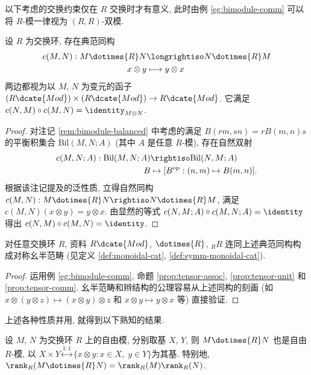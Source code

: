 以下考虑的交换约束仅在 $R$ 交换时才有意义, 此时由例 \ref{eg:bimodule-comm} 可以将 $R$-模一律视为 $(R,R)$-双模.
\begin{proposition}[张量积的交换约束]\label{prop:tensor-comm}
	设 $R$ 为交换环, 存在典范同构
	\begin{align*}
		c(M, N): M \dotimes{R} N & \longrightiso N \dotimes{R} M \\
		x \otimes y & \longmapsto y \otimes x
	\end{align*}
	两边都视为以 $M$, $N$ 为变元的函子 $(R\dcate{Mod}) \times (R\dcate{Mod}) \to R\dcate{Mod}$. 它满足 $c(N, M) \circ c(M, N) = \identity_{M \otimes N}$.
\end{proposition}
\begin{proof}
	对注记 \ref{rem:bimodule-balanced} 中考虑的满足 $B(rm, sn) = r B(m,n) s$ 的平衡积集合 $\text{Bil}(M,N;A)$ (其中 $A$ 是任意 $R$-模), 存在自然双射
	\begin{align*}
		c(M,N;A): \text{Bil}(M, N; A) & \rightiso \text{Bil}(N,M; A) \\
		B & \mapsto [B^\text{op}: (n,m) \mapsto B(m,n)].
	\end{align*}
	根据该注记提及的泛性质, 立得自然同构 $c(M,N): M \dotimes{R} N \rightiso N \dotimes{R} M$, 满足 $c(M,N)(x \otimes y) = y \otimes x$. 由显然的等式 $c(N, M; A) \circ c(M, N; A) = \identity$ 得出 $c(N, M) \circ c(M, N) = \identity$.
\end{proof}

\begin{corollary}\label{prop:module-monoidal-cat}
	对任意交换环 $R$, 资料 $R\dcate{Mod}$, $\dotimes{R}$, ${}_R R$ 连同上述典范同构构成对称幺半范畴 (见定义 \ref{def:monoidal-cat}, \ref{def:symm-monoidal-cat}).
\end{corollary}
\begin{proof}
	运用例 \ref{eg:bimodule-comm}, 命题 \ref{prop:tensor-assoc}, \ref{prop:tensor-unit} 和 \ref{prop:tensor-comm}. 幺半范畴和辫结构的公理容易从上述同构的刻画 (如 $x \otimes (y \otimes z) \mapsto (x \otimes y) \otimes z$ 和 $x \otimes y \mapsto y \otimes x$ 等) 直接验证.
\end{proof}

上述各种性质并用, 就得到以下熟知的结果.
\begin{corollary}\label{prop:module-tensor-free}
	设 $M$, $N$ 为交换环 $R$ 上的自由模, 分别取基 $X$, $Y$, 则 $M \dotimes{R} N$ 也是自由 $R$-模, 以 $X \times Y \stackrel{1:1}{\longleftrightarrow} \{x \otimes y: x \in X,\; y \in Y \}$为其基. 特别地, $\rank_R( M \dotimes{R} N) = \rank_R(M) \rank_R(N)$.
\end{corollary}

